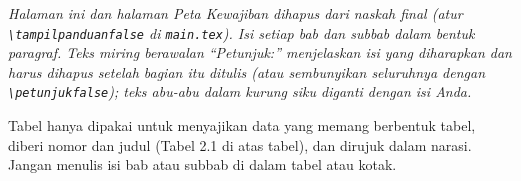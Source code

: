 
{\itshape
\noindent Halaman ini dan halaman Peta Kewajiban dihapus dari naskah final
(atur {\upshape\texttt{\textbackslash tampilpanduanfalse}} di \texttt{main.tex}). Isi
setiap bab dan subbab dalam bentuk paragraf. Teks miring berawalan
``Petunjuk:'' menjelaskan isi yang diharapkan dan harus dihapus setelah bagian
itu ditulis (atau sembunyikan seluruhnya dengan
{\upshape\texttt{\textbackslash petunjukfalse}}); teks abu-abu dalam kurung siku diganti
dengan isi Anda.

Tabel hanya dipakai untuk menyajikan data yang memang berbentuk tabel, diberi
nomor dan judul (Tabel 2.1 di atas tabel), dan dirujuk dalam narasi. Jangan
menulis isi bab atau subbab di dalam tabel atau kotak.\par}

